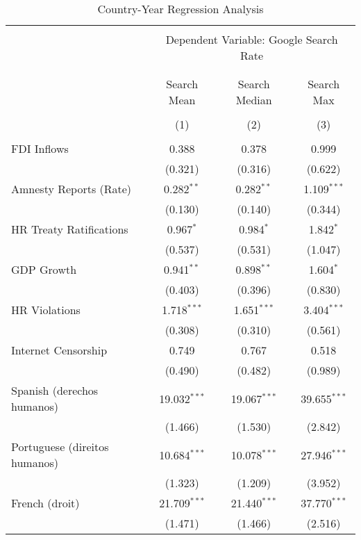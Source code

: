 
\begin{table}[!htbp] \centering 
  \caption{Country-Year Regression Analysis} 
  \label{} 
\begin{tabular}{@{\extracolsep{5pt}}lccc} 
\\[-1.8ex]\hline 
\hline \\[-1.8ex] 
 & \multicolumn{3}{c}{Dependent Variable: Google Search Rate} \\ 
\cline{2-4} 
\\[-1.8ex] & \multicolumn{3}{c}{ } \\ 
 & Search Mean & Search Median & Search Max \\ 
\\[-1.8ex] & (1) & (2) & (3)\\ 
\hline \\[-1.8ex] 
 FDI Inflows & 0.388 & 0.378 & 0.999 \\ 
  & (0.321) & (0.316) & (0.622) \\ 
  Amnesty Reports (Rate) & 0.282$^{**}$ & 0.282$^{**}$ & 1.109$^{***}$ \\ 
  & (0.130) & (0.140) & (0.344) \\ 
  HR Treaty Ratifications & 0.967$^{*}$ & 0.984$^{*}$ & 1.842$^{*}$ \\ 
  & (0.537) & (0.531) & (1.047) \\ 
  GDP Growth & 0.941$^{**}$ & 0.898$^{**}$ & 1.604$^{*}$ \\ 
  & (0.403) & (0.396) & (0.830) \\ 
  HR Violations & 1.718$^{***}$ & 1.651$^{***}$ & 3.404$^{***}$ \\ 
  & (0.308) & (0.310) & (0.561) \\ 
  Internet Censorship & 0.749 & 0.767 & 0.518 \\ 
  & (0.490) & (0.482) & (0.989) \\ 
  Spanish (derechos humanos) & 19.032$^{***}$ & 19.067$^{***}$ & 39.655$^{***}$ \\ 
  & (1.466) & (1.530) & (2.842) \\ 
  Portuguese (direitos humanos) & 10.684$^{***}$ & 10.078$^{***}$ & 27.946$^{***}$ \\ 
  & (1.323) & (1.209) & (3.952) \\ 
  French (droit) & 21.709$^{***}$ & 21.440$^{***}$ & 37.770$^{***}$ \\ 
  & (1.471) & (1.466) & (2.516) \\ 

\end{tabular}
\end{table}
